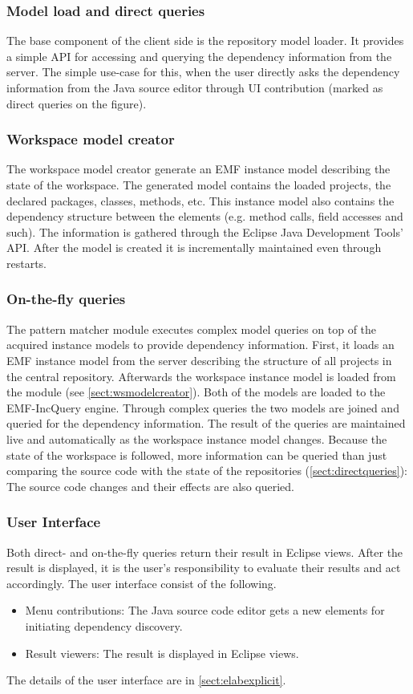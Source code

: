 \subsubsection{Model load and direct queries}\label{sect:directqueries}
The base component of the client side is the repository model loader. It
provides a simple API for accessing and querying the dependency information from
the server. The simple use-case for this, when the user directly asks the
dependency information from the Java source editor through UI contribution
(marked as direct queries on the figure).

\subsubsection{Workspace model creator}\label{sect:wsmodelcreator}
The workspace model creator generate an EMF instance model describing the
state of the workspace. The generated model contains the loaded projects, the
declared packages, classes, methods, etc. This instance model also contains the
dependency structure between the elements (e.g. method calls, field accesses and
such). The information is gathered through the Eclipse Java Development Tools'
API. After the model is created it is incrementally maintained even through 
restarts.

\subsubsection{On-the-fly queries}
The pattern matcher module executes complex model queries on top of the acquired
instance models to provide dependency information. First, it loads an EMF
instance model from the server describing the structure of all projects in the
central repository. Afterwards the workspace instance model is loaded from the
module (see \autoref{sect:wsmodelcreator}). Both of the models are loaded to the
EMF-IncQuery engine. Through complex queries the two models are joined and
queried for the dependency information. The result of the queries are maintained
live and automatically as the workspace instance model changes. Because the
state of the workspace is followed, more information can be queried than just
comparing the source code with the state of the repositories
(\autoref{sect:directqueries}): The source code changes and their effects
are also queried.

\subsubsection{User Interface}
Both direct- and on-the-fly queries return their result in Eclipse views. After
the result is displayed, it is the user's responsibility to evaluate their
results and act accordingly. The user interface consist of the following.
\begin{itemize}
  \item Menu contributions: The Java source code editor gets a new elements for 
initiating dependency discovery.
  \item Result viewers: The result is displayed in Eclipse views.
\end{itemize}
The details of the user interface are in \autoref{sect:elabexplicit}.

